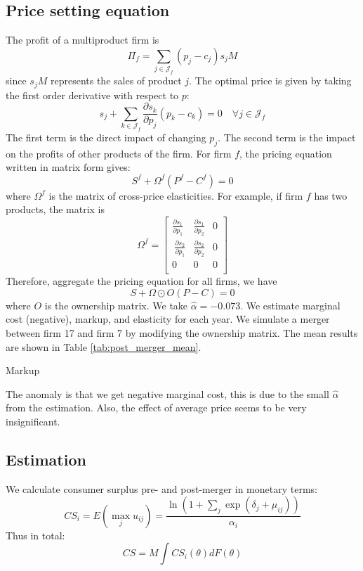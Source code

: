 \documentclass[12pt]{article}[margin=1in]
\begin{document}
\subsection{Price setting equation}
The profit of a multiproduct firm is
\begin{equation*}
    \Pi_f = \sum_{j\in \mathcal{J}_f} (p_j - c_j) s_j M
\end{equation*}
since $s_j M$ represents the sales of product $j$. The optimal price is given by taking the first order derivative with respect to $p$:
\begin{equation*}
    s_j + \sum_{k\in \mathcal{J}_f} \frac{\partial s_k}{\partial p_j} (p_k - c_k) = 0 \quad \forall j \in \mathcal{J}_f
\end{equation*}
The first term is the direct impact of changing $p_j$. The second term is the
impact on the profits of other products of the firm.
For firm $f$, the pricing equation written in matrix form gives:
\begin{equation*}
    S^f + \Omega^f (P^f - C^f) = 0
\end{equation*}
where $\Omega^f$ is the matrix of cross-price elasticities.
For example, if firm $f$ has two products, the matrix is $$
    \Omega^f =\begin{bmatrix}
        \frac{\partial s_1}{\partial p_1} & \frac{\partial s_1}{\partial p_2} & 0 \\\ \frac{\partial s_2}{\partial p_1} &\frac{\partial s_2}{\partial p_2} & 0 \\0 & 0 &0\\
    \end{bmatrix}$$
Therefore, aggregate the pricing equation for all firms, we have $$ S + \Omega
    \odot O (P-C) = 0 $$ where $O$ is the ownership matrix.
We take $\hat{\alpha} = -0.073$. We estimate marginal cost (negative), markup,
and elasticity for each year. We simulate a merger between firm 17 and firm 7
by modifying the ownership matrix. The mean results are shown in Table
\ref{tab:post_merger_mean}.

\begin{table}[h!]
    \fontsize{10pt}{12pt}\selectfont
    \centering
    
    \caption{Markup}
    \label{tab:post_merger_mean}
\end{table}
The anomaly is that we get
negative marginal cost, this is due to the small $\hat{\alpha}$ from the
estimation. Also, the effect of average price seems to be very insignificant.

\subsection{Estimation}
We calculate consumer surplus pre- and post-merger in monetary terms:
\begin{equation*}
    CS_i = E(\max_j u_{ij}) = \frac{\ln(1 + \sum_j \exp(\delta_j + \mu_{ij}))}{\alpha_i}
\end{equation*}
Thus in total:
\begin{equation*}
    CS = M \int CS_i(\theta) dF(\theta)
\end{equation*}
\end{document}
